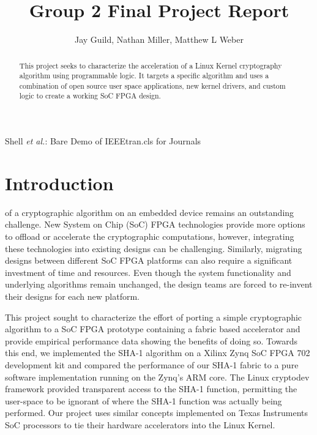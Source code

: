 \documentclass[journal]{IEEEtran}
\begin{document}
\title{Group 2 Final Project Report}
\author{Jay Guild, Nathan Miller, Matthew L Weber}

%
{Shell \MakeLowercase{\textit{et al.}}: Bare Demo of IEEEtran.cls for Journals}
% 

\maketitle

\begin{abstract}
This project seeks to characterize the acceleration of a Linux Kernel cryptography algorithm using programmable logic. It targets a specific algorithm and uses a combination of open source user space applications, new kernel drivers, and custom logic to create a working SoC FPGA design.
\end{abstract}


\IEEEpeerreviewmaketitle

\section{Introduction}
 of a cryptographic algorithm on an embedded device remains an outstanding challenge. New System on Chip (SoC) FPGA technologies provide more options to offload or accelerate the cryptographic computations, however, integrating these technologies into existing designs can be challenging. Similarly, migrating designs between different SoC FPGA platforms can also require a significant investment of time and resources. Even though the system functionality and underlying algorithms remain unchanged, the design teams are forced to re-invent their designs for each new platform.

This project sought to characterize the effort of porting a simple cryptographic algorithm to a SoC FPGA prototype containing a fabric based accelerator and provide empirical performance data showing the benefits of doing so. Towards this end, we implemented the SHA-1 algorithm on a Xilinx Zynq SoC FPGA 702 development kit and compared the performance of our SHA-1 fabric to a pure software implementation running on the Zynq’s ARM core.  The Linux cryptodev framework provided transparent access to the SHA-1 function, permitting the user-space to be ignorant of where the SHA-1 function was actually being performed.   Our project uses similar concepts implemented on Texas Instruments SoC processors to tie their hardware accelerators into the Linux Kernel.
\end{document}
